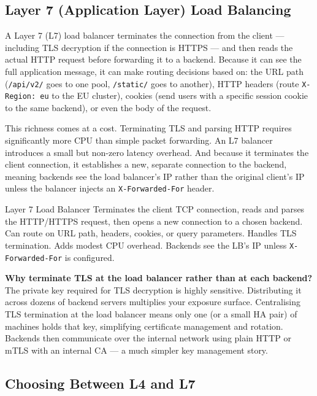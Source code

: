\documentclass[11pt,a4paper]{article}
\begin{document}
\subsection{Layer 7 (Application Layer) Load Balancing}

A Layer 7 (L7) load balancer terminates the connection from the client --- including TLS decryption
if the connection is HTTPS --- and then reads the actual HTTP request before forwarding it to a
backend. Because it can see the full application message, it can make routing decisions based on:
the URL path (\texttt{/api/v2/} goes to one pool, \texttt{/static/} goes to another), HTTP headers
(route \texttt{X-Region: eu} to the EU cluster), cookies (send users with a specific session cookie
to the same backend), or even the body of the request.

This richness comes at a cost. Terminating TLS and parsing HTTP requires significantly more CPU than
simple packet forwarding. An L7 balancer introduces a small but non-zero latency overhead. And
because it terminates the client connection, it establishes a new, separate connection to the
backend, meaning backends see the load balancer's IP rather than the original client's IP unless the
balancer injects an \texttt{X-Forwarded-For} header.

\begin{termbox}{Layer 7 Load Balancer}
  Terminates the client TCP connection, reads and parses the HTTP/HTTPS request, then opens a new
  connection to a chosen backend. Can route on URL path, headers, cookies, or query parameters.
  Handles TLS termination. Adds modest CPU overhead. Backends see the LB's IP unless
  \texttt{X-Forwarded-For} is configured.
\end{termbox}

\begin{thinkbox}
  \textbf{Why terminate TLS at the load balancer rather than at each backend?} The private key
  required for TLS decryption is highly sensitive. Distributing it across dozens of backend servers
  multiplies your exposure surface. Centralising TLS termination at the load balancer means only
  one (or a small HA pair) of machines holds that key, simplifying certificate management and
  rotation. Backends then communicate over the internal network using plain HTTP or mTLS with an
  internal CA --- a much simpler key management story.
\end{thinkbox}

\subsection{Choosing Between L4 and L7}
\end{document}
